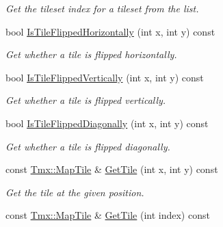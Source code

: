 \begin{DoxyCompactItemize}
\begin{DoxyCompactList}\small\item\em Get the tileset index for a tileset from the list. \end{DoxyCompactList}\item 
\hypertarget{classTmx_1_1TileLayer_a65cf0f77fcebdb13a4d8a58f6af35634}{bool \hyperlink{classTmx_1_1TileLayer_a65cf0f77fcebdb13a4d8a58f6af35634}{Is\-Tile\-Flipped\-Horizontally} (int x, int y) const }\label{classTmx_1_1TileLayer_a65cf0f77fcebdb13a4d8a58f6af35634}

\begin{DoxyCompactList}\small\item\em Get whether a tile is flipped horizontally. \end{DoxyCompactList}\item 
\hypertarget{classTmx_1_1TileLayer_a318e88a21c62a5bc642162dcc0b880c8}{bool \hyperlink{classTmx_1_1TileLayer_a318e88a21c62a5bc642162dcc0b880c8}{Is\-Tile\-Flipped\-Vertically} (int x, int y) const }\label{classTmx_1_1TileLayer_a318e88a21c62a5bc642162dcc0b880c8}

\begin{DoxyCompactList}\small\item\em Get whether a tile is flipped vertically. \end{DoxyCompactList}\item 
\hypertarget{classTmx_1_1TileLayer_a151af08626fb9edee291dc20f431c130}{bool \hyperlink{classTmx_1_1TileLayer_a151af08626fb9edee291dc20f431c130}{Is\-Tile\-Flipped\-Diagonally} (int x, int y) const }\label{classTmx_1_1TileLayer_a151af08626fb9edee291dc20f431c130}

\begin{DoxyCompactList}\small\item\em Get whether a tile is flipped diagonally. \end{DoxyCompactList}\item 
\hypertarget{classTmx_1_1TileLayer_aa945617d235b87e9b532ddcad2f88af0}{const \hyperlink{structTmx_1_1MapTile}{Tmx\-::\-Map\-Tile} \& \hyperlink{classTmx_1_1TileLayer_aa945617d235b87e9b532ddcad2f88af0}{Get\-Tile} (int x, int y) const }\label{classTmx_1_1TileLayer_aa945617d235b87e9b532ddcad2f88af0}

\begin{DoxyCompactList}\small\item\em Get the tile at the given position. \end{DoxyCompactList}\item 
\hypertarget{classTmx_1_1TileLayer_a26aa35c451cdca8dce826167717280e0}{const \hyperlink{structTmx_1_1MapTile}{Tmx\-::\-Map\-Tile} \& \hyperlink{classTmx_1_1TileLayer_a26aa35c451cdca8dce826167717280e0}{Get\-Tile} (int index) const }\label{classTmx_1_1TileLayer_a26aa35c451cdca8dce826167717280e0}


\end{DoxyCompactItemize}
